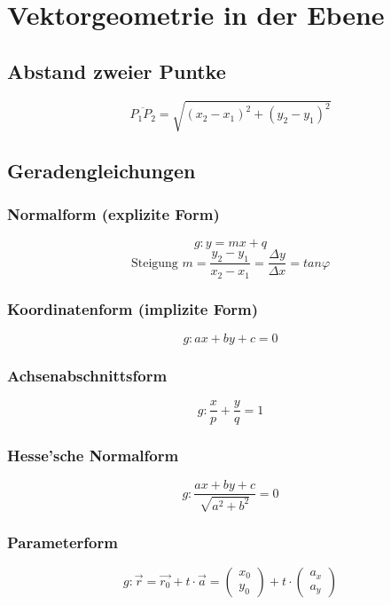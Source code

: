 \section{Vektorgeometrie in der Ebene}

\subsection{Abstand zweier Puntke}
\[ \boxed{ \overline{P_1 P_2} = \sqrt{ (x_2 - x_1)^2 + (y_2 - y_1)^2 } } \]

\subsection{Geradengleichungen}

\subsubsection{Normalform (explizite Form)}
\[ \boxed{ g: y= mx + q }\]
\[ \boxed{ \text{Steigung } m = \frac{y_2 - y_1}{x_2 - x_1} = \frac{\Delta y}{\Delta x}  = tan \varphi } \]

\subsubsection{Koordinatenform (implizite Form)}
\[ \boxed{ g: ax + by + c = 0 } \]

\subsubsection{Achsenabschnittsform}
\[ \boxed{ g: \frac{x}{p} + \frac{y}{q} = 1 } \]

\subsubsection{Hesse'sche Normalform}
\[ \boxed{ g:  \frac{ax + by + c}{\sqrt{ a^2 + b^2 } } = 0 }  \]

\subsubsection{Parameterform}
\[ \boxed{ 
    g: \vec{r} = \vec{r_0} + t \cdot \vec{a}  = 
      \left( 
	\begin{array}{cc} 
	  x_0 \\ y_0
	\end{array}
      \right)
      + t \cdot 
      \left( 
	\begin{array}{cc} 
	  a_x \\ a_y
	\end{array}
      \right)  
   }
\]


